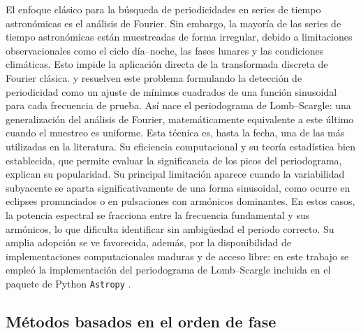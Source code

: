 \documentclass[12pt,letterpaper,oneside]{book}
\begin{document}
El enfoque cl\'asico para la b\'usqueda de periodicidades en series de tiempo astron\'omicas es el an\'alisis de Fourier. Sin embargo, la mayor\'ia de las series de tiempo astron\'omicas est\'an muestreadas de forma irregular, debido a limitaciones observacionales como el ciclo d\'ia--noche, las fases lunares y las condiciones clim\'aticas. Esto impide la aplicaci\'on directa de la transformada discreta de Fourier cl\'asica. \citet{lomb_1976} y \citet{scargle_1982} resuelven este problema formulando la detecci\'on de periodicidad como un ajuste de m\'inimos cuadrados de una funci\'on sinusoidal para cada frecuencia de prueba. As\'i nace el periodograma de Lomb--Scargle: una generalizaci\'on del an\'alisis de Fourier, matem\'aticamente equivalente a este \'ultimo cuando el muestreo es uniforme. Esta t\'ecnica es, hasta la fecha, una de las m\'as utilizadas en la literatura. Su eficiencia computacional y su teor\'ia estad\'istica bien establecida, que permite evaluar la significancia de los picos del periodograma, explican su popularidad. Su principal limitaci\'on aparece cuando la variabilidad subyacente se aparta significativamente de una forma sinusoidal, como ocurre en eclipses pronunciados o en pulsaciones con arm\'onicos dominantes. En estos casos, la potencia espectral se fracciona entre la frecuencia fundamental y sus arm\'onicos, lo que dificulta identificar sin ambig\"uedad el periodo correcto. Su amplia adopci\'on se ve favorecida, adem\'as, por la disponibilidad de implementaciones computacionales maduras y de acceso libre: en este trabajo se emple\'o la implementaci\'on del periodograma de Lomb--Scargle incluida en el paquete de Python \texttt{Astropy} \citep{astropy}.

\subsection{M\'etodos basados en el orden de fase}
\end{document}
